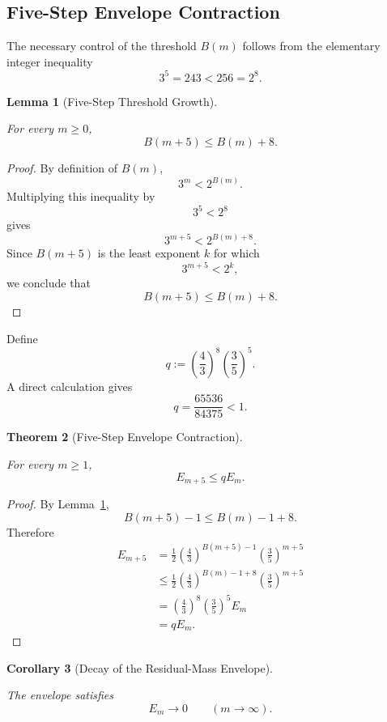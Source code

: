 \documentclass[12pt, oneside]{article}
\numberwithin{equation}{section}
\theoremstyle{definition}
\theoremstyle{plain}
\newtheorem{theorem}{Theorem}[section]
\newtheorem{lemma}[theorem]{Lemma}
\newtheorem{corollary}[theorem]{Corollary}
\theoremstyle{remark}
\begin{document}
\subsection{Five-Step Envelope Contraction}

The necessary control of the threshold \(B(m)\) follows from the elementary
integer inequality
\[
3^5=243<256=2^8.
\]

\begin{lemma}[Five-Step Threshold Growth]
\label{lem:five-step-threshold-growth}

For every \(m\ge0\),
\[
\boxed{
B(m+5)\le B(m)+8.
}
\]
\end{lemma}

\begin{proof}
By definition of \(B(m)\),
\[
3^m<2^{B(m)}.
\]
Multiplying this inequality by
\[
3^5<2^8
\]
gives
\[
3^{m+5}
<
2^{B(m)+8}.
\]
Since \(B(m+5)\) is the least exponent \(k\) for which
\[
3^{m+5}<2^k,
\]
we conclude that
\[
B(m+5)\le B(m)+8.
\]
\end{proof}

Define
\[
q
:=
\left(\frac43\right)^8
\left(\frac35\right)^5.
\]
A direct calculation gives
\[
q
=
\frac{65536}{84375}
<1.
\]

\begin{theorem}[Five-Step Envelope Contraction]
\label{thm:five-step-envelope-contraction}

For every \(m\ge1\),
\[
\boxed{
E_{m+5}\le qE_m.
}
\]
\end{theorem}

\begin{proof}
By Lemma~\ref{lem:five-step-threshold-growth},
\[
B(m+5)-1
\le
B(m)-1+8.
\]
Therefore
\[
\begin{aligned}
E_{m+5}
&=
\frac12
\left(\frac43\right)^{B(m+5)-1}
\left(\frac35\right)^{m+5}
\\
&\le
\frac12
\left(\frac43\right)^{B(m)-1+8}
\left(\frac35\right)^{m+5}
\\
&=
\left(\frac43\right)^8
\left(\frac35\right)^5
E_m
\\
&=
qE_m.
\end{aligned}
\]
\end{proof}

\begin{corollary}[Decay of the Residual-Mass Envelope]
\label{cor:residual-envelope-decay}

The envelope satisfies
\[
\boxed{
E_m\longrightarrow0
\qquad (m\to\infty).
}
\]
\end{corollary}
\end{document}

